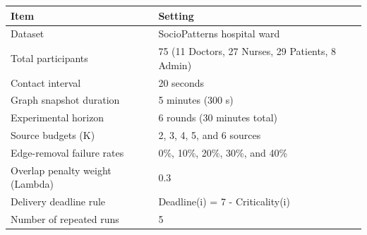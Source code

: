 \begin{tabular}{ll}
\toprule
Item & Setting \\
\midrule
Dataset & SocioPatterns hospital ward \\
Total participants & 75 (11 Doctors, 27 Nurses, 29 Patients, 8 Admin) \\
Contact interval & 20 seconds \\
Graph snapshot duration & 5 minutes (300 s) \\
Experimental horizon & 6 rounds (30 minutes total) \\
Source budgets (K) & 2, 3, 4, 5, and 6 sources \\
Edge-removal failure rates & 0\%, 10\%, 20\%, 30\%, and 40\% \\
Overlap penalty weight (Lambda) & 0.3 \\
Delivery deadline rule & Deadline(i) = 7 - Criticality(i) \\
Number of repeated runs & 5 \\
\bottomrule
\end{tabular}

